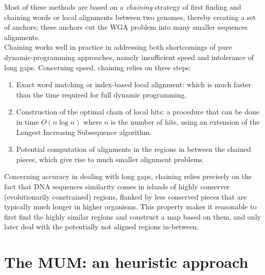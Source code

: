 \documentclass[twocolumn,twoside]{Jornadas}
\begin{document}
Most of these methods are based on a \textit{chaining} strategy of first finding and chaining words or local alignments between two genomes, thereby creating a set of anchors; these anchors cut the WGA problem into many smaller sequences alignments.\\
Chaining works well in practice in addressing both shortcomings of pure dynamic-programming approaches, namely insufficient speed and intolerance of long gaps. Concerning speed, chaining relies on three steps:
\begin{enumerate}
\item Exact word matching or index-based local alignment: which is much faster than the time required for full dynamic programming.
\item Construction of the optimal chain of local hits: a procedure that can be done in time $O(n\log n)$ where $n$ is the number of hits, using an extension of the Longest Increasing Subsequence algorithm.
\item Potential computation of alignments in the regions in between the chained pieces, which give rise to much smaller alignment problems.
\end{enumerate}
Concerning accuracy in dealing with long gaps, chaining relies precisely on the fact that DNA sequences similarity comes in islands of highly conserver (evolutionarily constrained) regions, flanked by less conserved pieces that are typically much longer in higher organisms. This property makes it reasonable to first find the highly similar regions and construct a map based on them, and only later deal with the potentially not aligned regions in-between. 
\section{The MUM: an heuristic approach}
\end{document}
